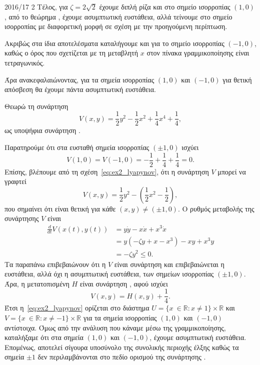 \begin{solution}{2016/17 2}
    Τέλος, για \( \zeta = 2\sqrt{2} \) έχουμε διπλή ρίζα και στο σημείο
    ισορροπίας \( (1, 0) \), από το θεώρημα , έχουμε
    ασυμπτωτική ευστάθεια, αλλά τείνουμε στο σημείο ισορροπίας με διαφορετική
    μορφή σε σχέση με την προηγούμενη περίπτωση.

    Ακριβώς στα ίδια αποτελέσματα καταλήγουμε και για το σημείο ισορροπίας
    \( (-1, 0) \), καθώς ο όρος που σχετίζεται με τη μεταβλητή \(x\) στον πίνακα
    γραμμικοποίησης είναι τετραγωνικός.

    Άρα ανακεφαλαιώνοντας, για τα σημεία ισορροπίας \( (1, 0) \) και \( (-1, 0)
    \) για θετική απόσβεση θα έχουμε πάντα ασυμπτωτική ευστάθεια.

    Θεωρώ τη συνάρτηση
    \begin{equation}\label{eq:ex2_lyapynov}
        V(x, y) = \frac{1}{2}y^2 - \frac{1}{2}x^2 + \frac{1}{4}x^4 +
        \frac{1}{4},
    \end{equation}
    ως υποψήφια συνάρτηση .

    Παρατηρούμε ότι στα ευσταθή σημεία ισορροπίας \( (\pm1, 0) \) ισχύει
    \begin{equation*}
        V(1, 0) =  V(-1, 0) = -\frac{1}{2} + \frac{1}{4} + \frac{1}{4} = 0.
    \end{equation*}
    Επίσης, βλέπουμε από τη σχέση~\eqref{eq:ex2_lyapynov}, ότι η συνάρτηση \( V \)
    μπορεί να γραφτεί
    \begin{equation*}
        V(x, y) = \frac{1}{2}y^2 - \left( \frac{1}{2}x^2 - \frac{1}{2} \right),
    \end{equation*}
    που σημαίνει ότι είναι θετική για κάθε \( (x, y) \neq (\pm1, 0) \). Ο ρυθμός
    μεταβολής της συνάρτησης \( V \) είναι
    \begin{align*}
        \frac{d}{dt}V\left( x(t), y(t) \right) &= y\dot{y} - x\dot{x} +
        x^3\dot{x} \\
        &= y\left( -\zeta y + x - x^3 \right) - xy + x^3 y \\
        &= -\zeta y^2 \leq 0.
    \end{align*}
    Τα παραπάνω επιβεβαιώνουν ότι η \( V \) είναι συνάρτηση  και
    επιβεβαιώνεται η ευστάθεια, αλλά όχι η ασυμπτωτική ευστάθεια, των σημείων
    ισορροπίας \( (\pm1, 0) \). Άρα, η μετατοπισμένη \( H \) είναι συνάρτηση
    , αφού ισχύει
    \begin{equation*}
        V(x, y) = H(x, y) + \frac{1}{4}.
    \end{equation*}
    Έτσι η~\eqref{eq:ex2_lyapynov} ορίζεται στο διάστημα \( U = \{ x\ \in
    \mathbb{R}: x \neq 1 \}\times\mathbb{R} \) και \( V = \{ x\ \in
    \mathbb{R}: x \neq -1 \}\times\mathbb{R} \) για τα σημεία ισορροπίας \(
    (1, 0) \) και \( (-1, 0) \) αντίστοιχα. Όμως από την ανάλυση που
    κάναμε μέσω της γραμμικοποίησης, καταλήξαμε ότι στα σημεία \( (1, 0) \) και
    \( (-1, 0) \), έχουμε ασυμπτωτική ευστάθεια. Επομένως, αποτελεί σίγουρα
    υποσύνολο της συνολικής περιοχής έλξης καθώς τα σημεία \( \pm1 \)
    δεν περιλαμβάνονται στο πεδίο ορισμού της συνάρτησης .


\end{solution}
